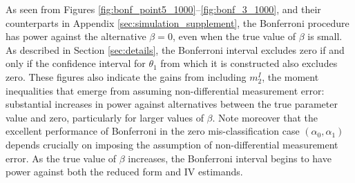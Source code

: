 As seen from Figures \ref{fig:bonf_point5_1000}--\ref{fig:bonf_3_1000}, and their counterparts in Appendix \ref{sec:simulation_supplement}, the Bonferroni procedure has power against the alternative $\beta = 0$, even when the true value of $\beta$ is small.
As described in Section \ref{sec:details}, the Bonferroni interval excludes zero if and only if the confidence interval for $\theta_1$ from which it is constructed also excludes zero.
These figures also indicate the gains from including $m_2^I$, the moment inequalities that emerge from assuming non-differential measurement error: substantial increases in power against alternatives between the true parameter value and zero, particularly for larger values of $\beta$.
Note moreover that the excellent performance of Bonferroni in the zero mis-classification case $(\alpha_0, \alpha_1)$ depends crucially on imposing the assumption of non-differential measurement error.
As the true value of $\beta$ increases, the Bonferroni interval begins to have power against both the reduced form and IV estimands.


